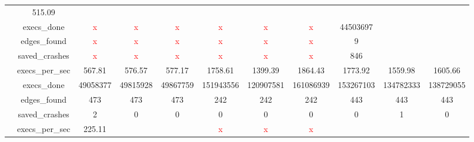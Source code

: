 \documentclass{report}
\newcommand{\thickhline}{\noalign{\hrule height 1.2pt}}
\begin{document}
\begin{table}[h]
\begin{adjustwidth}{-4.7cm}{-4.7cm}
{\begin{tabular}{|c|c!{\vrule width 1.2pt}c|c|c!{\vrule width 1.2pt}c|c|c!{\vrule width 1.2pt}c|c|c|}
                                                & 515.09& & \\
                            & execs\_done   & \textcolor{red}{x} & \textcolor{red}{x} & \textcolor{red}{x} 
                                            & \textcolor{red}{x} & \textcolor{red}{x} & \textcolor{red}{x}
                                            & 44503697& & \\
                            & edges\_found  & \textcolor{red}{x} & \textcolor{red}{x} & \textcolor{red}{x} 
                                            & \textcolor{red}{x} & \textcolor{red}{x} & \textcolor{red}{x}
                                            & 9& & \\
                            & saved\_crashes    & \textcolor{red}{x} & \textcolor{red}{x} & \textcolor{red}{x} 
                                                & \textcolor{red}{x} & \textcolor{red}{x} & \textcolor{red}{x}
                                                & 846& & \\
                            \thickhline
                            & execs\_per\_sec   & 567.81  & 576.57   & 577.17 
                                                & 1758.61 & 1399.39  & 1864.43 
                                                & 1773.92 & 1559.98  & 1605.66\\
                            & execs\_done   & 49058377  & 49815928   & 49867759 
                                            & 151943556 & 120907581  & 161086939 
                                            & 153267103 & 134782333  & 138729055\\
                            & edges\_found      & 473 & 473 & 473 
                                                & 242 & 242 & 242
                                                & 443 & 443 & 443\\
                            & saved\_crashes    & 2 & 0 & 0 
                                                & 0 & 0 & 0
                                                & 0 & 1 & 0\\
                            \thickhline
                            & execs\_per\_sec   & 225.11 & & 
                                                & \textcolor{red}{x} & \textcolor{red}{x} & \textcolor{red}{x} 

\end{tabular}}
\end{adjustwidth}
\end{table}
\end{document}
